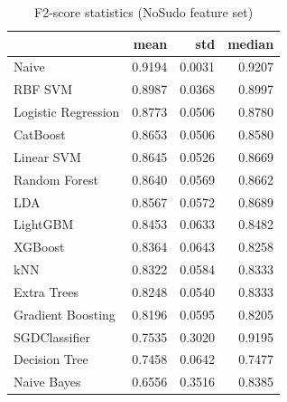 \begin{table}
\caption{F2-score statistics (NoSudo feature set)}
\label{tab:f2_NoSudo_stats}
\begin{tabular}{lrrr}
\toprule
 & mean & std & median \\
\midrule
Naive & 0.9194 & 0.0031 & 0.9207 \\
RBF SVM & 0.8987 & 0.0368 & 0.8997 \\
Logistic Regression & 0.8773 & 0.0506 & 0.8780 \\
CatBoost & 0.8653 & 0.0506 & 0.8580 \\
Linear SVM & 0.8645 & 0.0526 & 0.8669 \\
Random Forest & 0.8640 & 0.0569 & 0.8662 \\
LDA & 0.8567 & 0.0572 & 0.8689 \\
LightGBM & 0.8453 & 0.0633 & 0.8482 \\
XGBoost & 0.8364 & 0.0643 & 0.8258 \\
kNN & 0.8322 & 0.0584 & 0.8333 \\
Extra Trees & 0.8248 & 0.0540 & 0.8333 \\
Gradient Boosting & 0.8196 & 0.0595 & 0.8205 \\
SGDClassifier & 0.7535 & 0.3020 & 0.9195 \\
Decision Tree & 0.7458 & 0.0642 & 0.7477 \\
Naive Bayes & 0.6556 & 0.3516 & 0.8385 \\
\bottomrule
\end{tabular}
\end{table}
